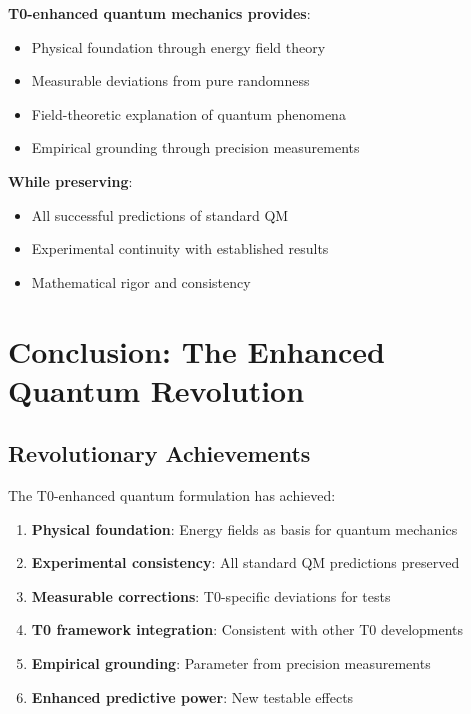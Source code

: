 \documentclass[12pt,a4paper]{article}
\begin{document}
	\begin{tcolorbox}[colback=purple!5!white,colframe=purple!75!black,title=Beyond Quantum Mysticism]
		\textbf{T0-enhanced quantum mechanics provides}:
		\begin{itemize}
			\item Physical foundation through energy field theory
			\item Measurable deviations from pure randomness
			\item Field-theoretic explanation of quantum phenomena
			\item Empirical grounding through precision measurements
		\end{itemize}
		
		\textbf{While preserving}:
		\begin{itemize}
			\item All successful predictions of standard QM
			\item Experimental continuity with established results
			\item Mathematical rigor and consistency
		\end{itemize}
	\end{tcolorbox}
	
	\section{Conclusion: The Enhanced Quantum Revolution}
	
	\subsection{Revolutionary Achievements}
	
	The T0-enhanced quantum formulation has achieved:
	
	\begin{enumerate}
		\item \textbf{Physical foundation}: Energy fields as basis for quantum mechanics
		\item \textbf{Experimental consistency}: All standard QM predictions preserved
		\item \textbf{Measurable corrections}: T0-specific deviations for tests
		\item \textbf{T0 framework integration}: Consistent with other T0 developments
		\item \textbf{Empirical grounding}: Parameter from precision measurements
		\item \textbf{Enhanced predictive power}: New testable effects
	\end{enumerate}
	
\end{document}
